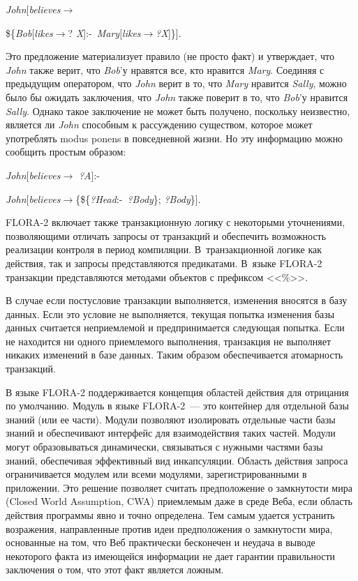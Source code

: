 \begin{multicols}{2}
\smallskip

\noindent
\textit{John}[\textit{believes}\;$\rightarrow$

\$\{\textit{Bob}[\textit{likes}\;$\rightarrow$\;?
\textit{X}]:\;-\ \textit{Mary}[\textit{likes}\;$\rightarrow$\;\textit{?X}]\}].

\smallskip

\noindent
Это предложение материализует правило (не прос\-то факт) и утверждает, что \textit{John} 
также верит, что \textit{Bob}'у нравятся все, кто нравится \textit{Mary}. Соединяя с 
предыдущим оператором, что \textit{John} верит в то, что \textit{Mary} нравится \textit{Sally}, 
можно было бы ожидать заключения, что \textit{John} также поверит в то, что \textit{Bob}'у 
нравится \textit{Sally}. Однако такое заключение не может быть получено, поскольку 
неизвестно, является ли \textit{John} способным к рассуждению существом, которое может 
употреблять modus ponens в повседневной жизни. Но эту информацию можно сообщить 
простым образом: 

\smallskip

\noindent
\textit{John}[\textit{believes}\;$\rightarrow$\;\textit{ ?A}]:\;-\ 

\textit{John}[\textit{believes}\;$\rightarrow$\;\{\$\{\textit{?Head}:\;-\ \textit{?Body}\}; 
\textit{?Body}\}].

\smallskip


FLORA-2 включает также транзакционную логику с некоторыми уточнениями, 
позволяющими отличать запросы от транзакций и обеспечить возможность реализации 
контроля в период компиляции. В~транзакционной логике как действия, так и запросы 
представляются предикатами. В~языке FLORA-2 транзакции представляются методами 
объектов с префиксом <<\%>>.

В случае если постусловие транзакции выполняется, изменения вносятся в базу данных. 
Если это условие не выполняется, текущая попытка изменения базы данных считается 
неприемлемой и предпринимается следующая попытка. Если не находится ни одного 
приемлемого выполнения, транзакция не выполняет никаких изменений в базе данных. 
Таким образом обеспечивается атомарность транзакций.

В языке FLORA-2 поддерживается концепция областей действия для отрицания по 
умолчанию. Модуль в языке FLORA-2~--- это контейнер для отдельной базы знаний (или ее 
части). Модули позволяют изолировать отдельные части базы знаний и обеспечивают 
интерфейс для взаимодействия таких частей. Модули могут образовываться динамически, 
связываться с нужными частями базы знаний, обеспечивая эффективный вид 
инкапсуляции. Область действия запроса ограничивается модулем или всеми модулями, 
зарегистрированными в приложении. Это решение позволяет считать предположение о 
замкнутости мира (Closed World Assumption, CWA) приемлемым даже в среде Веба, если область действия программы 
явно и точно определена. Тем самым удается устранить возражения, направленные против 
идеи предположения о замкнутости мира, основанные на том, что Веб практически 
бесконечен и неудача в выводе некоторого факта из имеющейся информации не дает 
гарантии правильности заключения о том, что этот факт является ложным.


\end{multicols}
